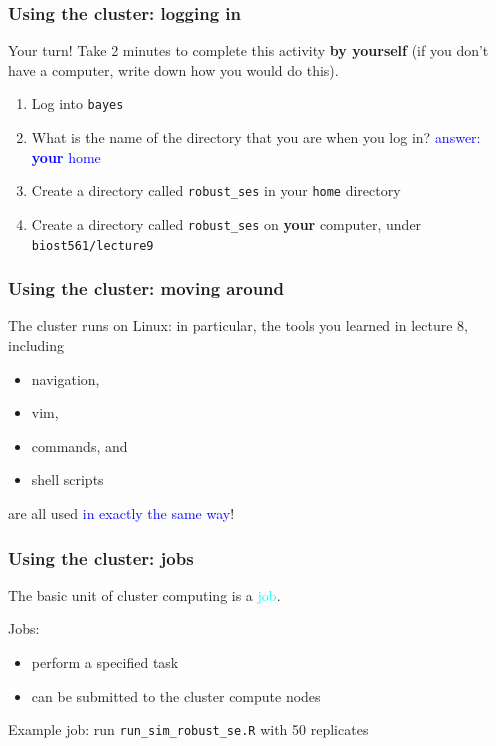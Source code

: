 \documentclass[12pt, 
hyperref={colorlinks=true, linkcolor=BlueViolet, urlcolor=BlueViolet},dvipsnames]{beamer}
\begin{document}
\begin{frame}
\frametitle{Using the cluster: logging in}
Your turn! Take 2 minutes to complete this activity \textbf{by yourself} (if you don't have a computer, write down how you would do this).
\begin{enumerate}
\item Log into \texttt{bayes}
\item What is the name of the directory that you are when you log in? \textcolor{blue}{answer: \textbf{your} home}
\item Create a directory called \texttt{robust\_ses} in your \texttt{home} directory
\item Create a directory called \texttt{robust\_ses} on \textbf{your} computer, under \texttt{biost561/lecture9}
\end{enumerate}
\end{frame}

\begin{frame}
\frametitle{Using the cluster: moving around}
The cluster runs on Linux: in particular, the tools you learned in lecture 8, including \vspace{-0.3cm} \pause
\begin{itemize}
\item navigation, \pause
\item vim, \pause
\item commands, \pause and
\item shell scripts
\end{itemize}
are all used \textcolor{blue}{in exactly the same way}!
\end{frame}

\begin{frame}
\frametitle{Using the cluster: jobs}
The basic unit of cluster computing is a \textcolor{cyan}{job}. \pause

Jobs: \vspace{-0.3cm} \pause
\begin{itemize}
\item perform a specified task \pause
\item can be submitted to the cluster compute nodes \pause
\end{itemize}

Example job: run \texttt{run\_sim\_robust\_se.R} with 50 replicates
\end{frame}
\end{document}
